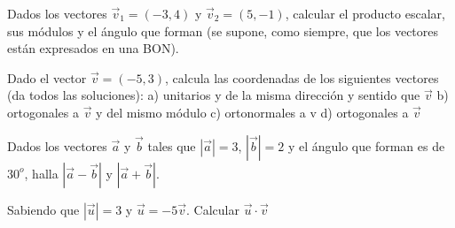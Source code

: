 \begin{mipropuesto}

Dados los vectores $\vec v_1=(-3,4)$ y $\vec v_2=(5,-1)$, calcular el producto escalar, sus módulos y el ángulo que forman (se supone, como siempre, que los vectores están expresados en una BON).
\end{mipropuesto}

\vspace{-8mm}
\begin{flushright}
\begin{footnotesize} \textcolor{gris}{}	\end{footnotesize}
\end{flushright}

\begin{mipropuesto}

Dado el vector $\vec v=(-5,3)$, calcula las coordenadas de los siguientes vectores (da todos las soluciones):
a) unitarios y de la misma dirección y sentido que $\vec v$
b) ortogonales a $\vec v$ y del mismo módulo
c) ortonormales a v	
d) ortogonales a $\vec v$
\end{mipropuesto}

\vspace{-8mm}
\begin{flushright}
\begin{footnotesize} \textcolor{gris}{}	\end{footnotesize}
\end{flushright}

\begin{mipropuesto}

Dados los vectores $\vec a$ y $\vec b$ tales que $|\vec a| = 3$, $|\vec b| = 2$ y el ángulo que forman es de $30^o$,  halla $| \vec a−\vec b|$ y $|\vec a+\vec b|$.	
\end{mipropuesto}

\vspace{-8mm}
\begin{flushright}
\begin{footnotesize} \textcolor{gris}{}	\end{footnotesize}
\end{flushright}

\begin{mipropuesto}

 Sabiendo que $|\vec u| = 3$ y $\vec u = -5\vec v$. Calcular $\vec u \cdot \vec v$	
\end{mipropuesto}

